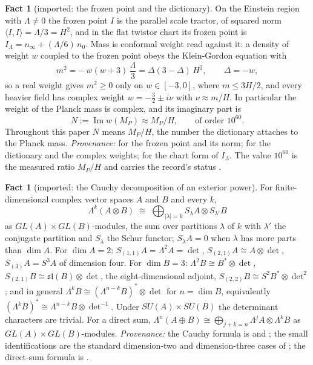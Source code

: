 \documentclass[11pt]{article}
\theoremstyle{definition}
\newtheorem{fact}[theorem]{Fact}
\newcommand{\ip}[2]{\langle #1, #2\rangle}
\begin{document}
\begin{fact}[imported: the frozen point and the dictionary]\label{fact:dictionary}
On the Einstein region with $\Lambda \neq 0$ the frozen point $I$ is the parallel scale tractor, of squared norm $\ip{I}{I} = \Lambda/3 = H^{2}$, and in the flat twistor chart its frozen point is $I_{\Lambda} = n_{\infty} + (\Lambda/6)\,n_{0}$. Mass is conformal weight read against it: a density of weight $w$ coupled to the frozen point obeys the Klein-Gordon equation with
\[
m^{2} = -\,w(w+3)\,\frac{\Lambda}{3} = \Delta(3-\Delta)\,H^{2}, \qquad \Delta = -w,
\]
so a real weight gives $m^{2} \ge 0$ only on $w \in [-3, 0]$, where $m \le 3H/2$, and every heavier field has complex weight $w = -\tfrac32 \pm i\nu$ with $\nu \approx m/H$. In particular the weight of the Planck mass is complex, and its imaginary part is
\[
N := \operatorname{Im} w(M_{P}) \approx M_{P}/H, \qquad\text{of order } 10^{60}.
\]
Throughout this paper $N$ means $M_{P}/H$, the number the dictionary attaches to the Planck mass. \emph{Provenance:} \cite[Thms.~4.5, 4.7]{ButlerT6} for the frozen point and its norm; \cite[Thm.~3.1, Cor.~3.2]{ButlerT11} for the dictionary and the complex weights; \cite[Lem.~5.1]{ButlerT11} for the chart form of $I_{\Lambda}$. The value $10^{60}$ is the measured ratio $M_{P}/H$ and carries the record's status \cite{PDG2024}.
\end{fact}

\begin{fact}[imported: the Cauchy decomposition of an exterior power]\label{fact:cauchy}
For finite-dimensional complex vector spaces $A$ and $B$ and every $k$,
\[
\Lambda^{k}(A \otimes B) \;\cong\; \bigoplus_{|\lambda| = k} S_{\lambda}A \otimes S_{\lambda'}B
\]
as $GL(A) \times GL(B)$-modules, the sum over partitions $\lambda$ of $k$ with $\lambda'$ the conjugate partition and $S_{\lambda}$ the Schur functor; $S_{\lambda}A = 0$ when $\lambda$ has more parts than $\dim A$. For $\dim A = 2$: $S_{(1,1)}A = \Lambda^{2}A = \det$, $S_{(2,1)}A \cong A \otimes \det$, $S_{(3)}A = S^{3}A$ of dimension four. For $\dim B = 3$: $\Lambda^{2}B \cong B^{*} \otimes \det$, $S_{(2,1)}B \cong \mathfrak{sl}(B) \otimes \det$, the eight-dimensional adjoint, $S_{(2,2)}B \cong S^{2}B^{*} \otimes \det^{2}$; and in general $\Lambda^{k}B \cong (\Lambda^{n-k}B)^{*} \otimes \det$ for $n = \dim B$, equivalently $(\Lambda^{k}B)^{*} \cong \Lambda^{n-k}B \otimes \det^{-1}$. Under $SU(A) \times SU(B)$ the determinant characters are trivial. For a direct sum, $\Lambda^{n}(A \oplus B) \cong \bigoplus_{j+k=n}\Lambda^{j}A \otimes \Lambda^{k}B$ as $GL(A) \times GL(B)$-modules. \emph{Provenance:} the Cauchy formula is \cite[I, \S 4, (4.3$'$)]{Macdonald1995} and \cite[Ex.~6.11]{FultonHarris1991}; the small identifications are the standard dimension-two and dimension-three cases of \cite[\S 6.1, \S 15.3]{FultonHarris1991}; the direct-sum formula is \cite[App.~B.2]{FultonHarris1991}.
\end{fact}
\end{document}
